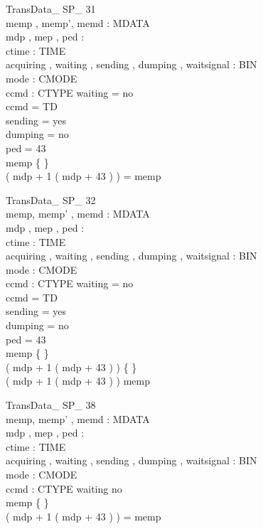 \begin{schema}{TransData\_ SP\_ 31}\\
 memp , memp', memd : \seq MDATA \\
 mdp , mep , ped : \nat \\
 ctime : TIME \\
 acquiring , waiting , sending , dumping , waitsignal : BIN \\
 mode : CMODE \\
 ccmd : CTYPE 
\where
 waiting = no \\
 ccmd = TD \\
 sending = yes \\
 dumping = no \\
 ped = 43 \\
 memp \neq \{ \} \\
 ( mdp + 1 \upto ( mdp + 43 ) ) = \dom memp
\end{schema}


\begin{schema}{TransData\_ SP\_ 32}\\
 memp, memp' , memd : \seq MDATA \\
 mdp , mep , ped : \nat \\
 ctime : TIME \\
 acquiring , waiting , sending , dumping , waitsignal : BIN \\
 mode : CMODE \\
 ccmd : CTYPE 
\where
 waiting = no \\
 ccmd = TD \\
 sending = yes \\
 dumping = no \\
 ped = 43 \\
 memp \neq \{ \} \\
 ( mdp + 1 \upto ( mdp + 43 ) ) \neq \{ \} \\
 ( mdp + 1 \upto ( mdp + 43 ) ) \subset \dom memp
\end{schema}

\begin{schema}{TransData\_ SP\_ 38}\\
 memp, memp' , memd : \seq MDATA \\
 mdp , mep , ped : \nat \\
 ctime : TIME \\
 acquiring , waiting , sending , dumping , waitsignal : BIN \\
 mode : CMODE \\
 ccmd : CTYPE 
\where
 waiting \neq no \\
 memp \neq \{ \} \\
 ( mdp + 1 \upto ( mdp + 43 ) ) = \dom memp
\end{schema}


